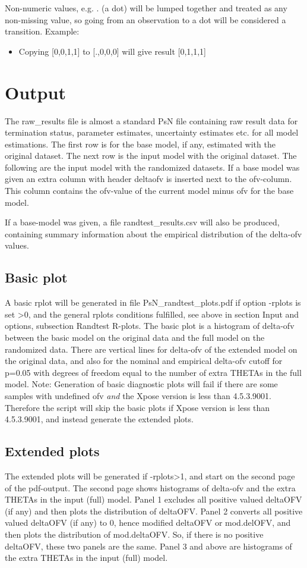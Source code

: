 \noindent Non-numeric values, e.g. . (a dot) will be lumped together and treated as any non-missing value, so going from an observation to a dot will be considered a transition. Example:
\begin{itemize}
\item Copying [0,0,1,1] to  [.,0,0,0] will give result [0,1,1,1] 
\end{itemize}

\section{Output}

The raw\_results file is almost a standard PsN file containing raw result data for termination status, parameter estimates, uncertainty estimates etc. for all model estimations. The first row is for the base model, if any, estimated with the original dataset. The next row is the input model with the original dataset. The following are the input model with the randomized datasets. If a base model was given an extra column with header deltaofv is inserted next to the ofv-column. This column contains the ofv-value of the current model minus ofv for the base model.

If a base-model was given, a file randtest\_results.csv will also be produced, 
containing summary information about the empirical distribution of the
delta-ofv values.

\subsection{Basic plot}
A basic rplot will be generated in file PsN\_randtest\_plots.pdf if option -rplots is set >0,
and the general rplots conditions fulfilled, see above in section Input and options, subsection Randtest R-plots.
The basic plot is a histogram of delta-ofv between the basic model on the original data and
the full model on the randomized data. 
There are vertical lines for delta-ofv of the extended model on the original data,
and also for the
nominal and empirical delta-ofv cutoff for p=0.05 with degrees of freedom equal to the number of extra THETAs in
the full model.
Note: Generation of basic diagnostic plots will fail if there are some samples
with undefined ofv \emph{and} the Xpose version is less than 4.5.3.9001.
Therefore the script will skip the basic plots if Xpose version is less than 4.5.3.9001, and instead generate the extended plots.

\subsection{Extended plots}
The extended plots will be generated if -rplots>1, and start on the second page of the pdf-output. The second page shows
histograms of delta-ofv and the extra THETAs in the input (full) model. Panel 1 excludes all positive valued deltaOFV (if any) and then plots the distribution of deltaOFV. Panel 2 converts all positive valued deltaOFV (if any) to 0, hence modified deltaOFV or mod.delOFV, and then plots the distribution of mod.deltaOFV. So, if there is no positive deltaOFV, these two panels are the same. Panel 3 and above are histograms of the extra THETAs in the input (full) model.

